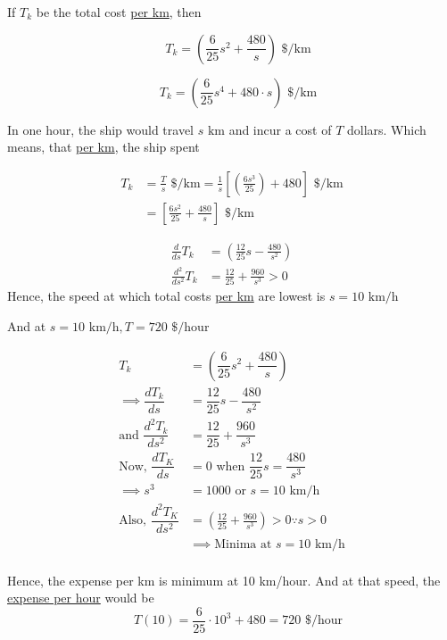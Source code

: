 \documentclass[14pt,fleqn]{extarticle}
\newcommand\dph{\text{ \$/hour}}
\newcommand\kmph{\text{ km/h}}
\newcommand\konst{\left( \frac{6s^3}{25} \right)}
\newcommand\dpk{\text{ \$/km}}
\begin{document}
\begin{problem}
\begin{step}
\end{step}
\begin{step}
	\begin{options}
		\correct
		
		If $T_k$ be the total cost \underline{per km}, then 
		
      \[\quad T_k = \left(\dfrac{6}{25}s^2 + \dfrac{480}{s}\right)\dpk\]
      

		\incorrect

		
      \[\quad T_k = \left(\dfrac{6}{25}s^4 + 480\cdot s\right)\dpk\]
      

	\end{options}
	\reason
	
	In one hour, the ship would travel $s\text{ km}$ and incur a cost of $T$ dollars. Which means, that \underline{per km}, the ship spent 
	
	\begin{align}
	T_k &= \frac{T}{s}\dpk = \frac{1}{s} \left[\konst + 480 \right]\dpk  \\
	&= \left[\frac{6s^2}{25} + \frac{480}{s} \right]\dpk
\end{align}
	      
\end{step}
\begin{step}
	\begin{options}
		\correct
		
		\begin{align}
	\frac{d}{ds}T_k &= \left(\frac{12}{25}s - \frac{480}{s^2} \right) \\
	\frac{d^2}{ds^2}T_k &= \frac{12}{25} + \frac{960}{s^3} > 0
\end{align}
Hence, the speed at which total costs \underline{per km} are lowest is 
$s = 10 \kmph$ \newline 

And at $s = 10\kmph, T = 720 \dph$       

	\end{options}
	\reason

	
      \begin{align}
        T_k &= \left(\dfrac{6}{25}s^2 + \dfrac{480}{s}\right) \\
        \implies\dfrac{d T_k}{ds} &= \dfrac{12}{25}s - \dfrac{480}{s^2} \\
        \text{and }\dfrac{d^2 T_k}{ds^2} &= \dfrac{12}{25} + \dfrac{960}{s^3} \\
        \text{Now, } \dfrac{dT_K}{ds} &= 0 \text{ when }\dfrac{12}{25}s = \dfrac{480}{s^3} \\
        \implies s^3 &= 1000 \text{ or }  s = 10 \kmph\\
        \text{Also, }\dfrac{d^2 T_K}{ds^2} &= \left(\frac{12}{25} + \frac{960}{s^3} \right) > 0 \because s > 0 \\
        &\implies\text{Minima  at } s = 10\kmph 
      \end{align} \\
      Hence, the expense per km is minimum at
      10 km/hour. And at that speed, the
      \underline{expense per hour} would be 
      \[\quad T(10) = \dfrac{6}{25}\cdot 10^3 + 480 = 720 \dph\]
      
\end{step}
\end{problem}
\end{document}

